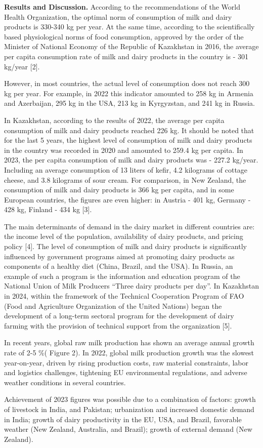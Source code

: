 \begin{multicols}{2}
{\bfseries Results and Discussion.} According to the recommendations of the
World Health Organization, the optimal norm of consumption of milk and
dairy products is 330-340 kg per year. At the same time, according to
the scientifically based physiological norms of food consumption,
approved by the order of the Minister of National Economy of the
Republic of Kazakhstan in 2016, the average per capita consumption rate
of milk and dairy products in the country is - 301 kg/year {[}2{]}.

However, in most countries, the actual level of consumption does not
reach 300 kg per year. For example, in 2022 this indicator amounted to
258 kg in Armenia and Azerbaijan, 295 kg in the USA, 213 kg in
Kyrgyzstan, and 241 kg in Russia.

In Kazakhstan, according to the results of 2022, the average per capita
consumption of milk and dairy products reached 226 kg. It should be
noted that for the last 5 years, the highest level of consumption of
milk and dairy products in the country was recorded in 2020 and amounted
to 259.4 kg per capita. In 2023, the per capita consumption of milk and
dairy products was - 227.2 kg/year. Including an average consumption of
13 liters of kefir, 4.2 kilograms of cottage cheese, and 3.8 kilograms
of sour cream. For comparison, in New Zealand, the consumption of milk
and dairy products is 366 kg per capita, and in some European countries,
the figures are even higher: in Austria - 401 kg, Germany - 428 kg,
Finland - 434 kg {[}3{]}.

The main determinants of demand in the dairy market in different
countries are: the income level of the population, availability of dairy
products, and pricing policy {[}4{]}. The level of consumption of milk
and dairy products is significantly influenced by government programs
aimed at promoting dairy products as components of a healthy diet
(China, Brazil, and the USA). In Russia, an example of such a program is
the information and education program of the National Union of Milk
Producers ``Three dairy products per day''. In Kazakhstan in 2024,
within the framework of the Technical Cooperation Program of FAO (Food
and Agriculture Organization of the United Nations) began the
development of a long-term sectoral program for the development of dairy
farming with the provision of technical support from the organization
{[}5{]}.

In recent years, global raw milk production has shown an average annual
growth rate of 2-5 \%( Figure 2). In 2022, global milk production growth
was the slowest year-on-year, driven by rising production costs, raw
material constraints, labor and logistics challenges, tightening EU
environmental regulations, and adverse weather conditions in several
countries.

Achievement of 2023 figures was possible due to a combination of
factors: growth of livestock in India, and Pakistan; urbanization and
increased domestic demand in India; growth of dairy productivity in the
EU, USA, and Brazil, favorable weather (New Zealand, Australia, and
Brazil); growth of external demand (New Zealand).
\end{multicols}

